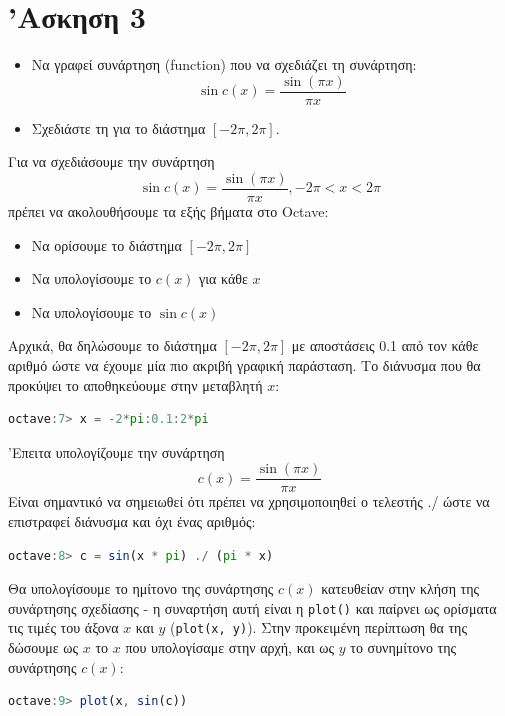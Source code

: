 \documentclass{article}
\begin{document}
\section{'Ασκηση 3}

\begin{itemize}
        \item Να γραφεί συνάρτηση (function) που να σχεδιάζει τη
                συνάρτηση: \[\sin c(x) = \frac{\sin(\pi x)}{\pi x}\]
        \item Σχεδιάστε τη για το διάστημα $[-2\pi,2\pi]$.
\end{itemize}

Για να σχεδιάσουμε την συνάρτηση 
\[\sin c(x) = \frac{\sin(\pi x)}{\pi x}, -2\pi < x < 2\pi\]
πρέπει να ακολουθήσουμε τα εξής βήματα στο Octave:

\begin{itemize}
        \item Να ορίσουμε το διάστημα $[-2\pi, 2\pi]$
        \item Να υπολογίσουμε το $c(x)$ για κάθε $x$
        \item Να υπολογίσουμε το $\sin c(x)$
\end{itemize}

Αρχικά, θα δηλώσουμε το διάστημα $[-2\pi,2\pi]$ με αποστάσεις 0.1
από τον κάθε αριθμό ώστε να έχουμε μία πιο ακριβή γραφική παράσταση.
Το διάνυσμα που θα προκύψει το αποθηκεύουμε στην μεταβλητή $x$:

\begin{lstlisting}[language=octave]
        octave:7> x = -2*pi:0.1:2*pi
\end{lstlisting}

'Επειτα υπολογίζουμε την συνάρτηση 
\[c(x) = \frac{\sin(\pi x)}{\pi x}\]
Είναι σημαντικό να σημειωθεί ότι
πρέπει να χρησιμοποιηθεί ο τελεστής ./ ώστε να επιστραφεί διάνυσμα
και όχι ένας αριθμός:

\begin{lstlisting}[language=octave]
        octave:8> c = sin(x * pi) ./ (pi * x)
\end{lstlisting}

Θα υπολογίσουμε το ημίτονο της συνάρτησης $c(x)$ κατευθείαν στην κλήση
της συνάρτησης σχεδίασης - η συναρτήση αυτή είναι η \lstinline{plot()} και παίρνει
ως ορίσματα τις τιμές του άξονα $x$ και $y$ (\lstinline{plot(x, y)}). Στην
προκειμένη περίπτωση θα της δώσουμε ως $x$ το $x$ που υπολογίσαμε στην αρχή,
και ως $y$ το συνημίτονο της συνάρτησης $c(x)$:

\begin{lstlisting}[language=octave]
        octave:9> plot(x, sin(c))
\end{lstlisting}
\end{document}
